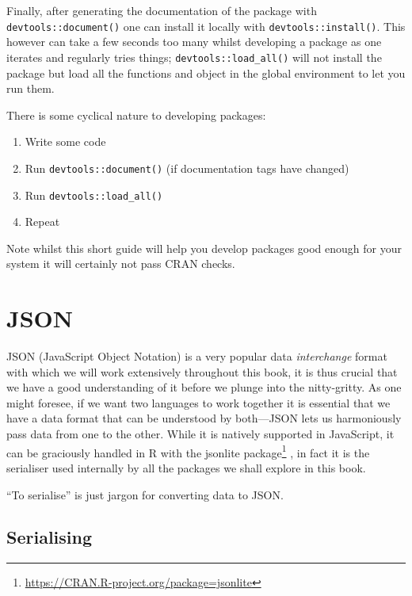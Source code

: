 \documentclass[
]{krantz}
\makeatletter
\providecommand{\tightlist}{%
  \setlength{\itemsep}{0pt}\setlength{\parskip}{0pt}}
\renewcommand{\href}[2]{#2\footnote{\url{#1}}}
\newenvironment{kframe}{%
\medskip{}
\setlength{\fboxsep}{.8em}
 \def\at@end@of@kframe{}%
 \ifinner\ifhmode%
  \def\at@end@of@kframe{\end{minipage}}%
  \begin{minipage}{\columnwidth}%
 \fi\fi%
 \def\FrameCommand##1{\hskip\@totalleftmargin \hskip-\fboxsep
 \colorbox{shadecolor}{##1}\hskip-\fboxsep
     \hskip-\linewidth \hskip-\@totalleftmargin \hskip\columnwidth}%
 \MakeFramed {\advance\hsize-\width
   \@totalleftmargin\z@ \linewidth\hsize
   \@setminipage}}%
 {\par\unskip\endMakeFramed%
 \at@end@of@kframe}
\newenvironment{rmdblock}[1]
  {
  \begin{itemize}
  \renewcommand{\labelitemi}{
    \raisebox{-.7\height}[0pt][0pt]{
      {\setkeys{Gin}{width=3em,keepaspectratio}\texttt{[image: images/\#1]}}
    }
  }
  \setlength{\fboxsep}{1em}
  \begin{kframe}
  \item
  }
  {
  \end{kframe}
  \end{itemize}
  }
\newenvironment{rmdnote}
  {\begin{rmdblock}{note}}
  {\end{rmdblock}}
\makeatother
\begin{document}
Finally, after generating the documentation of the package with \texttt{devtools::document()} one can install it locally with \texttt{devtools::install()}. This however can take a few seconds too many whilst developing a package as one iterates and regularly tries things; \texttt{devtools::load\_all()} will not install the package but load all the functions and object in the global environment to let you run them.

There is some cyclical nature to developing packages:

\begin{enumerate}
\def\labelenumi{\arabic{enumi}.}
\tightlist
\item
  Write some code
\item
  Run \texttt{devtools::document()} (if documentation tags have changed)
\item
  Run \texttt{devtools::load\_all()}
\item
  Repeat
\end{enumerate}

Note whilst this short guide will help you develop packages good enough for your system it will certainly not pass CRAN checks.

\hypertarget{json}{%
\section{JSON}\label{json}}

JSON (JavaScript Object Notation) is a very popular data \emph{interchange} format with which we will work extensively throughout this book, it is thus crucial that we have a good understanding of it before we plunge into the nitty-gritty. As one might foresee, if we want two languages to work together it is essential that we have a data format that can be understood by both---JSON lets us harmoniously pass data from one to the other. While it is natively supported in JavaScript, it can be graciously handled in R with the \href{https://CRAN.R-project.org/package=jsonlite}{jsonlite package} \citep{R-jsonlite}, in fact it is the serialiser used internally by all the packages we shall explore in this book.

\begin{rmdnote}
``To serialise'' is just jargon for converting data to JSON.
\end{rmdnote}

\hypertarget{serialising}{%
\subsection{Serialising}\label{serialising}}
\end{document}

